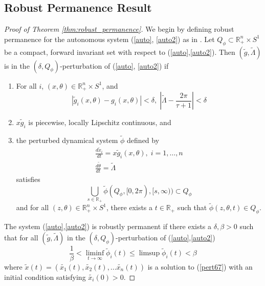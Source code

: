 \documentclass{article}
\theoremstyle{definition}
\newcommand{\R}{{\mathbb{R}}}
\begin{document}
\subsection{Robust Permanence Result}
\begin{proof}[Proof of Theorem \ref{thm:robust_permanence}]
We begin by defining robust permanence for the autonomous system (\ref{auto}, \ref{auto2}) as in \cite{patel_schreiber_2018}. Let $Q_\phi \subset \R^n_+ \times S^1$ be a compact, forward invariant set with respect to (\ref{auto},\ref{auto2}). Then $(\tilde{g}, \tilde{\Lambda})$ is in the $(\delta, Q_\phi)$-perturbation of (\ref{auto}, \ref{auto2}) if 
    \begin{enumerate}
        \item For all $i$, $(x,\theta) \in \R^n_+ \times S^1$, and
        $$
        |\tilde{g}_i(x,\theta)-g_i(x,\theta)| < \delta , \; |\tilde{\Lambda} - \frac{2\pi}{\tau + 1}| < \delta
        $$ 
        \item $x\tilde{g}_i$ is piecewise, locally Lipschitz continuous, and
        \item the perturbed dynamical system $\tilde{\phi}$ defined by
        \begin{equation} \label{pert67}
        \begin{split}
            \frac{d\tilde{x}_i}{dt} = x\tilde{g}_i(x,\theta), \; i = 1, \ldots, n\\
            \frac{d\tilde{\theta}}{dt} = \tilde \Lambda 
        \end{split}          
        \end{equation}
        satisfies
        $$
        \bigcup_{s \in \R_+}\tilde{\phi} (Q_\phi, [0,2\pi),[s,\infty)) \subset Q_\phi
        $$
        and for all $(z,\theta) \in \R^n_+ \times S^1$, there exists a $t\in \R_+$ such that $\tilde{\phi}(z,\theta, t) \in Q_\phi$.
    \end{enumerate}
The system (\ref{auto},\ref{auto2}) is robustly permanent if there exists a $\delta, \beta > 0$ such that for all $(\tilde g, \tilde \Lambda)$ in the $(\delta, Q_\phi)$-perturbation of (\ref{auto},\ref{auto2}) 
\begin{equation}\label{eqxn:robust_perm_auto}
\frac{1}{\beta} < \liminf_{t \to \infty}{\tilde{\phi}_i(t)} \leq \limsup{\tilde{\phi}_i(t)} < \beta
\end{equation}
where $\tilde{x}(t)=(\tilde{x_1}(t), \tilde{x_2}(t), ...\tilde{x_n}(t))$ is a solution to (\ref{pert67}) with an initial condition satisfying $\tilde{x_i}(0)>0$.


\end{proof}
\end{document}

